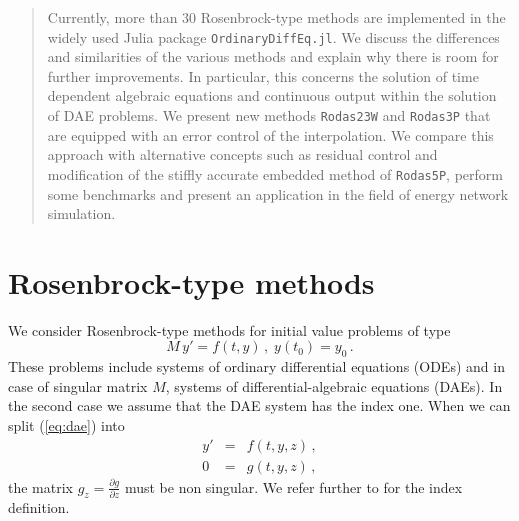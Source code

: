 \documentclass{juliacon}
\begin{document}


\maketitle

\begin{abstract}

Currently, more than 30 Rosenbrock-type methods are implemented in the widely used Julia package \verb|OrdinaryDiffEq.jl|.  
We discuss the differences and similarities of the various methods and explain why there is room for further improvements.
In particular, this concerns the solution of time dependent algebraic equations and continuous output within the solution of DAE problems. 
We present new methods \verb|Rodas23W| and \verb|Rodas3P| that are equipped with an error control of the interpolation.
We compare this approach with alternative concepts such as residual control and modification of the stiffly accurate embedded method of \verb|Rodas5P|, perform some 
benchmarks and present an application in the field of energy network simulation. 

\end{abstract}

\section{Rosenbrock-type methods}
We consider Rosenbrock-type methods for initial value problems of type
\begin{equation}
M \, y' = f(t,y) \, , \; y(t_0)=y_0 \, . \label{eq:dae} 
\end{equation}
These problems include systems of ordinary differential equations (ODEs) and in case of singular matrix $M$, systems of differential-algebraic equations (DAEs).
In the second case we assume that the DAE system has the index one.
When we can split (\ref{eq:dae}) into
\begin{eqnarray}
y' &=& f(t,y,z) \, , \label{eq:dae1} \\
0 &=& g(t,y,z) \, , \label{eq:dae2} 
\end{eqnarray}
the matrix $g_z = \frac{\partial g}{\partial z}$ must be non singular.
We refer further to \cite{hairer} for the index definition.
\end{document}
